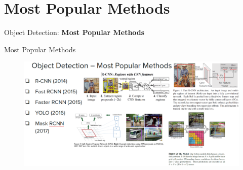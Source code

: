\section{Most Popular Methods}
\begin{frame}{}
    \LARGE Object Detection: \textbf{Most Popular Methods}
\end{frame}

\begin{frame}[allowframebreaks]{Most Popular Methods}
    \begin{figure}
        \centering
        \includegraphics[width=1.08\textwidth,height=1.0\textheight,keepaspectratio]{images/object-detect/methods.png}
    \end{figure}
\end{frame}